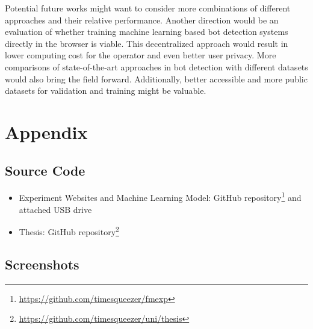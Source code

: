 \documentclass[
    fontsize=12pt,
    headings=small,
    parskip=half,           %
    bibliography=totoc,
    numbers=noenddot,       %
    open=any,               %
    final,                   %
    table
]{scrreprt}
\begin{document}
Potential future works might want to consider more combinations of different approaches and their relative performance. Another direction would be an evaluation of whether training machine learning based bot detection systems directly in the browser is viable. This decentralized approach would result in lower computing cost for the operator and even better user privacy. More comparisons of state-of-the-art approaches in bot detection with different datasets would also bring the field forward. Additionally, better accessible and more public datasets for validation and training might be valuable.

\begin{raggedright}
  \printbibliography
\end{raggedright}


\appendix

\chapter{Appendix}

\section{Source Code}

\begin{itemize}
    \item Experiment Websites and Machine Learning Model: GitHub repository\footnote{\url{https://github.com/timesqueezer/fmexp}} and attached USB drive
    \item Thesis: GitHub repository\footnote{\url{https://github.com/timesqueezer/uni/thesis}}
\end{itemize}

\section{Screenshots}
\end{document}
